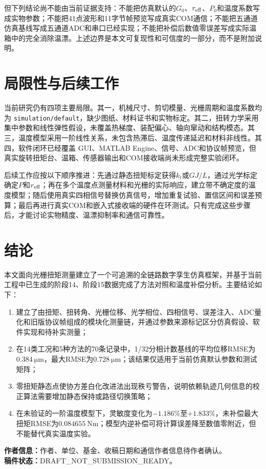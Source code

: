 \documentclass[UTF8,a4paper,12pt]{ctexart}
\newcommand{\simdefault}{\texttt{simulation/default}}
\begin{document}
但下列结论尚不能由当前证据支持：不能把仿真默认的$G_0$、$r_{\rm eff}$、$P_0$和温度系数写成实物参数；不能把41点波形和11字节帧预览写成真实COM通信；不能把五通道仿真基线写成五通道ADC和串口已经实现；不能把补偿后数值零误差写成实际温箱中的完全消除温漂。上述边界是本文可复现性和可信度的一部分，而不是附加说明。

\section{局限性与后续工作}

当前研究仍有四项主要局限。其一，机械尺寸、剪切模量、光栅周期和温度系数均为 \simdefault，缺少图纸、材料证书和实物标定。其二，扭转力学采用集中参数和线性弹性假设，未覆盖热梯度、装配偏心、轴向窜动和结构模态。其三，温度模型采用一阶线性关系，未包含热滞后、温度传递延迟和材料非线性。其四，软件闭环已经覆盖 GUI、MATLAB Engine、信号、ADC和协议帧预览，但真实旋转扭矩台、温箱、传感器输出和COM接收端尚未形成完整实验闭环。

后续工作应按以下顺序推进：先通过静态扭矩标定获得$k_t$或$GJ/L$，通过光学标定确定$P$和$r_{\rm eff}$；再在多个温度点测量材料和光栅的实际响应，建立带不确定度的温度模型；随后使用真实四相信号替换仿真信号，增加重复试验、置信区间和误差预算；最后再进行真实COM和嵌入式接收端的硬件在环测试。只有完成这些步骤后，才能讨论实物精度、温漂抑制率和通信可靠性。

\section{结论}

本文面向光栅扭矩测量建立了一个可追溯的全链路数字孪生仿真框架，并基于当前工程中已生成的阶段14、阶段15数据完成了方法对照和温度补偿分析。主要结论如下：
\begin{enumerate}[label=（\arabic*）,leftmargin=3em]
  \item 建立了由扭矩、扭转角、光栅位移、光学相位、四相信号、误差注入、ADC量化和旧版协议帧组成的模块化测量链，并通过参数来源标记区分仿真假设、软件实现和待补实测量；
  \item 在14类工况和5种方法的70条记录中，1/32分相计数基线的平均位移RMSE为$0.384~\si{\micro\metre}$，最大RMSE为$0.728~\si{\micro\metre}$；该结果仅适用于当前仿真默认参数和测试矩阵；
  \item 零扭矩静态点使协方差白化改进法出现秩亏警告，说明依赖轨迹几何信息的校正算法需要增加静态保持或路径切换策略；
  \item 在未验证的一阶温度模型下，灵敏度变化为$-1.186\%$至$+1.833\%$，未补偿最大扭矩RMSE为$0.084655~\si{\newton\metre}$；模型内逆补偿可将计算误差降至数值零附近，但不能替代真实温度实验。
\end{enumerate}

\vspace{1.5em}
\noindent\textbf{作者信息：}作者、单位、基金、收稿日期和通信作者信息待作者确认。\\
\noindent\textbf{稿件状态：}DRAFT\_NOT\_SUBMISSION\_READY。



\end{document}
